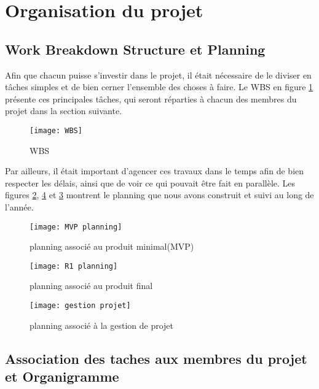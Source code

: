 \chapter*{Organisation du projet}
\label{sec:organisation}


\section*{Work Breakdown Structure et Planning}

Afin que chacun puisse s'investir dans le projet, il était nécessaire de le diviser en tâches simples et de bien cerner l'ensemble des choses à faire. Le WBS en figure \ref{fig:wbs} présente ces principales tâches, qui seront réparties à chacun des membres du projet dans la section suivante. 

\begin{figure}[!h]
	\centering
	\texttt{[image: WBS]}
	\caption{WBS}
	\label{fig:wbs}
\end{figure}


Par ailleurs, il était important d'agencer ces travaux dans le temps afin de bien respecter les délais, ainsi que de voir ce qui pouvait être fait en parallèle. Les figures \ref{fig:mvp-plan}, \ref{fig:gestion-proj} et \ref{fig:r1-plan} montrent le planning que nous avons construit et suivi au long de l'année.


\begin{figure}[!ht]
	\centering
	\texttt{[image: MVP planning]}
	\caption{planning associé au produit minimal(MVP)}
	\label{fig:mvp-plan}
\end{figure}

\begin{figure}[!ht]
	\centering
	\texttt{[image: R1 planning]}
	\caption{planning associé au produit final}
	\label{fig:r1-plan}
\end{figure}

\begin{figure}[!ht]
	\centering
	\texttt{[image: gestion projet]}
	\caption{planning associé à la gestion de projet}
	\label{fig:gestion-proj}
\end{figure}

\section*{Association des taches aux membres du projet et Organigramme}

